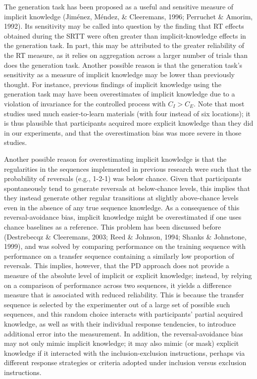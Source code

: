 \documentclass[floatsintext,man]{apa6}
\begin{document}
The generation task has been proposed as a useful and sensitive measure
of implicit knowledge (Jiménez, Méndez, \& Cleeremans, 1996; Perruchet
\& Amorim, 1992). Its sensitivity may be called into question by the
finding that RT effects obtained during the SRTT were often greater than
implicit-knowledge effects in the generation task. In part, this may be
attributed to the greater reliability of the RT measure, as it relies on
aggregation across a larger number of trials than does the generation
task. Another possible reason is that the generation task's sensitivity
as a measure of implicit knowledge may be lower than previously thought.
For instance, previous findings of implicit knowledge using the
generation task may have been overestimates of implicit knowledge due to
a violation of invariance for the controlled process with \(C_I > C_E\).
Note that most studies used much easier-to-learn materials (with four
instead of six locations); it is thus plausible that participants
acquired more explicit knowledge than they did in our experiments, and
that the overestimation bias was more severe in those studies.

Another possible reason for overestimating implicit knowledge is that
the regularities in the sequences implemented in previous research were
such that the probability of reversals (e.g., 1-2-1) was below chance.
Given that participants spontaneously tend to generate reversals at
below-chance levels, this implies that they instead generate other
regular transitions at slightly above-chance levels even in the absence
of any true sequence knowledge. As a consequence of this
reversal-avoidance bias, implicit knowledge might be overestimated if
one uses chance baselines as a reference. This problem has been
discussed before (Destrebecqz \& Cleeremans, 2003; Reed \& Johnson,
1994; Shanks \& Johnstone, 1999), and was solved by comparing
performance on the training sequence with performance on a transfer
sequence containing a similarly low proportion of reversals. This
implies, however, that the PD approach does not provide a measure of the
absolute level of implicit or explicit knowledge; instead, by relying on
a comparison of performance across two sequences, it yields a difference
measure that is associated with reduced reliability. This is because the
transfer sequence is selected by the experimenter out of a large set of
possible such sequences, and this random choice interacts with
participants' partial acquired knowledge, as well as with their
individual response tendencies, to introduce additional error into the
measurement. In addition, the reversal-avoidance bias may not only mimic
implicit knowledge; it may also mimic (or mask) explicit knowledge if it
interacted with the inclusion-exclusion instructions, perhaps via
different response strategies or criteria adopted under inclusion versus
exclusion instructions.
\end{document}
